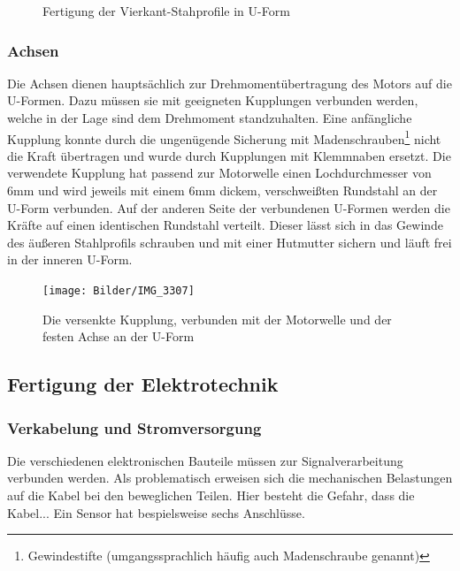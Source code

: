 \documentclass[a4paper, 12pt, bibtotocnumbered, liststotocnumbered]{scrartcl}
\begin{document}
	\begin{figure}[htb]
		\centering
		\hfill
		\caption{Fertigung der Vierkant-Stahprofile in U-Form}
	\end{figure}

	\subsubsection{Achsen}
	Die Achsen dienen hauptsächlich zur Drehmomentübertragung des Motors auf die U-Formen. Dazu müssen sie mit geeigneten Kupplungen verbunden werden, welche in der Lage sind dem Drehmoment standzuhalten. Eine anfängliche Kupplung konnte durch die ungenügende Sicherung mit Madenschrauben\footnote{Gewindestifte (umgangssprachlich häufig auch Madenschraube genannt)} nicht die Kraft übertragen und wurde durch Kupplungen mit Klemmnaben\cite{kupplung} ersetzt. Die verwendete Kupplung hat passend zur Motorwelle einen Lochdurchmesser von 6mm und wird jeweils mit einem 6mm dickem, verschweißten Rundstahl an der U-Form verbunden. Auf der anderen Seite der verbundenen U-Formen werden die Kräfte auf einen identischen Rundstahl verteilt. Dieser lässt sich in das Gewinde des äußeren Stahlprofils schrauben und mit einer Hutmutter sichern und läuft frei in der inneren U-Form.

	\begin{figure}[htb]
		\centering
		\texttt{[image: Bilder/IMG\_3307]}
		\caption{Die versenkte Kupplung, verbunden mit der Motorwelle und der festen Achse an der U-Form}
	\end{figure}

	\subsection{Fertigung der Elektrotechnik}
	\subsubsection{Verkabelung und Stromversorgung}
	Die verschiedenen elektronischen Bauteile müssen zur Signalverarbeitung verbunden werden. Als problematisch erweisen sich die mechanischen Belastungen auf die Kabel bei den beweglichen Teilen. Hier besteht die Gefahr, dass die Kabel...  Ein Sensor hat bespielsweise sechs Anschlüsse.
\end{document}
